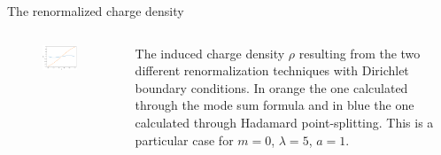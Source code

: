 \begin{frame}{The renormalized charge density}
	\begin{columns}
	    \begin{column}{0.5\textwidth}
	    	    \begin{figure}[h]
	    	    	\centering
	    	    	\includegraphics[width=0.9\textwidth]{figures/renormalization_comparison_rho.png}
	    	    \end{figure}
	    \end{column}
	    \begin{column}{0.5\textwidth}
	    	   The induced charge density $\rho$ resulting from the two different renormalization techniques with Dirichlet boundary conditions. In orange the one calculated through the mode sum formula and in blue the one calculated through Hadamard point-splitting. This is a particular case for $m = 0$, $\lambda = 5$,  $a=1$.
	    \end{column}
	\end{columns}
	    \end{frame}

